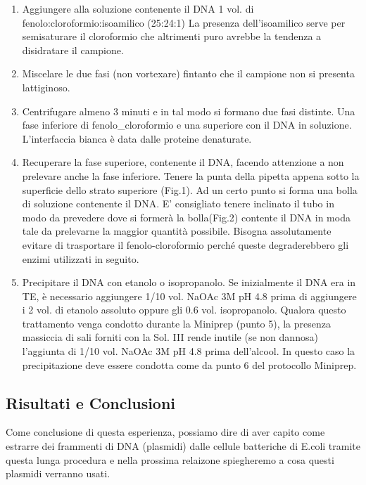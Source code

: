 \begin{enumerate}
  \item Aggiungere alla soluzione contenente il DNA 1 vol. di fenolo:cloroformio:isoamilico (25:24:1)
La presenza dell’isoamilico serve per semisaturare il cloroformio che altrimenti puro avrebbe la tendenza a disidratare il campione.

  \item Miscelare le due fasi (non vortexare) fintanto che il campione non si presenta lattiginoso.

  \item Centrifugare almeno 3 minuti e in tal modo si formano due fasi distinte. Una fase inferiore di fenolo_cloroformio e una superiore con il DNA in soluzione. L’interfaccia bianca è data dalle proteine denaturate.

  \item Recuperare la fase superiore, contenente il DNA, facendo attenzione a non prelevare anche la fase inferiore. Tenere la punta della pipetta appena sotto la superficie dello strato superiore (Fig.1). Ad un certo punto si forma una bolla di soluzione contenente il DNA. E’ consigliato tenere inclinato il tubo in modo da prevedere dove si formerà la bolla(Fig.2) contente il DNA in moda tale da prelevarne la maggior quantità possibile. Bisogna assolutamente evitare di trasportare il fenolo-cloroformio perché queste degraderebbero gli enzimi utilizzati in seguito.

  \item Precipitare il DNA con etanolo o isopropanolo. Se inizialmente il DNA era in TE, è necessario aggiungere 1/10 vol. NaOAc 3M pH 4.8 prima di aggiungere i 2 vol. di etanolo assoluto oppure gli 0.6 vol. isopropanolo. Qualora questo trattamento venga condotto durante la Miniprep (punto 5), la presenza massiccia di sali forniti con la Sol. III  rende inutile (se non dannosa) l’aggiunta di 1/10 vol. NaOAc 3M pH 4.8 prima dell’alcool. In questo caso la precipitazione deve essere condotta come da punto 6 del protocollo Miniprep.


\end{enumerate}

\subsection{Risultati e Conclusioni}

Come conclusione di questa esperienza, possiamo dire di aver capito come estrarre dei frammenti di DNA (plasmidi) dalle cellule batteriche di E.coli tramite questa lunga procedura e nella prossima relaizone spiegheremo a cosa questi plasmidi verranno usati.
